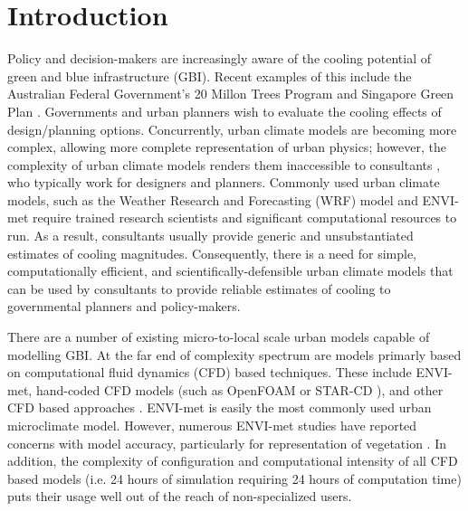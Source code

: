 \documentclass[journal abbreviation, manuscript]{copernicus}
\begin{document}




\section{Introduction}\label{sec:introduction}



Policy and decision-makers  are  increasingly aware of the cooling potential of  green and blue infrastructure (GBI). Recent examples of this include the Australian Federal Government's 20 Millon Trees Program \citep{CommonwealthofAustralia2017} and Singapore Green Plan \citep{SMEWR2012}.  Governments and urban planners wish to evaluate the cooling effects of design/planning options. Concurrently, urban climate models are becoming more  complex, allowing more complete representation of  urban physics; however, the complexity of urban climate models renders them inaccessible to consultants \citep{Elasson2000}, who typically work for designers and planners. Commonly used urban climate models, such as the Weather Research and Forecasting (WRF) model 
\citep{Skamarock2008} and ENVI-met \citep{Bruse1999} require trained research scientists and significant computational resources to run. As a result, consultants usually provide generic and unsubstantiated estimates of cooling magnitudes. Consequently, there is a need for simple, computationally efficient, and  scientifically-defensible urban climate models that can be used by consultants to provide reliable estimates of cooling to governmental planners and policy-makers. 

There are a number of existing micro-to-local scale urban models capable of modelling GBI. At the far end of complexity spectrum are models primarly based on computational fluid dynamics (CFD) based techniques. These include ENVI-met, hand-coded  CFD models (such as OpenFOAM \citep{OpenFOAM2011} or STAR-CD \citep{CDadapco2011}), and other CFD based approaches \citep{Bailey2014,Bailey2016,Kunz2000,Schlunzen2011a,Yamada2011,Bruse1999}. ENVI-met is easily the most commonly used urban microclimate model. However, numerous  ENVI-met studies have reported concerns with  model accuracy, particularly for representation of vegetation  \citep{Ali-Toudert2006b,Kruger2011,Acero2015,Spangenberg2008}. In addition, the complexity of configuration and computational intensity of all CFD based models (i.e. 24 hours of simulation requiring 24 hours of computation time) puts their usage well out of the reach of non-specialized users. 
\end{document}
